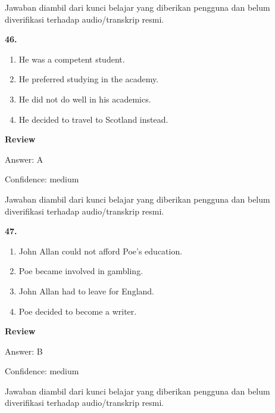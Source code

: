 \documentclass[12pt]{article}
\begin{document}
Jawaban diambil dari kunci belajar yang diberikan pengguna dan belum diverifikasi terhadap audio/transkrip resmi.\par
\endgroup
\par
\vspace{0.25\baselineskip}
\noindent\textbf{46.}
\begin{enumerate}[label=(\Alph*),leftmargin=*,itemsep=0.2em]
\item He was a competent student.
\item He preferred studying in the academy.
\item He did not do well in his academics.
\item He decided to travel to Scotland instead.
\end{enumerate}
\par
\begingroup
\setlength{\parskip}{0pt}
\setlength{\parindent}{0pt}
\textbf{Review}\par
Answer: A\par
Confidence: medium\par
Jawaban diambil dari kunci belajar yang diberikan pengguna dan belum diverifikasi terhadap audio/transkrip resmi.\par
\endgroup
\par
\vspace{0.25\baselineskip}
\noindent\textbf{47.}
\begin{enumerate}[label=(\Alph*),leftmargin=*,itemsep=0.2em]
\item John Allan could not afford Poe's education.
\item Poe became involved in gambling.
\item John Allan had to leave for England.
\item Poe decided to become a writer.
\end{enumerate}
\par
\begingroup
\setlength{\parskip}{0pt}
\setlength{\parindent}{0pt}
\textbf{Review}\par
Answer: B\par
Confidence: medium\par
Jawaban diambil dari kunci belajar yang diberikan pengguna dan belum diverifikasi terhadap audio/transkrip resmi.\par
\endgroup
\par
\vspace{0.25\baselineskip}
\end{document}
